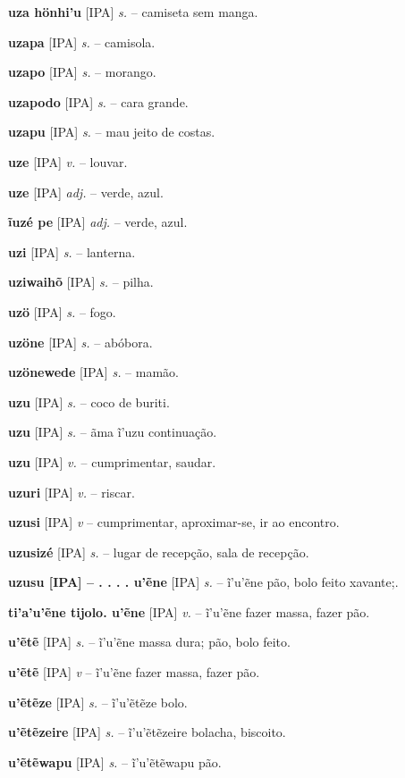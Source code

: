 \textbf{uza hönhi'u} [IPA] \textit{s.} -- camiseta sem manga.

\textbf{uzapa} [IPA] \textit{s.} -- camisola.

\textbf{uzapo} [IPA] \textit{s.} -- morango.

\textbf{uzapodo} [IPA] \textit{s.} -- cara grande.

\textbf{uzapu} [IPA] \textit{s.} -- mau jeito de costas.

\textbf{uze} [IPA] \textit{v.} -- louvar.

\textbf{uze} [IPA] \textit{adj.} -- verde, azul.

\textbf{ĩuzé  pe} [IPA] \textit{adj.} -- verde, azul. \href{https://xavante.pythonanywhere.com/static/dicionario/play.html?file=blue.wav}{\faHeadphones}

\textbf{uzi} [IPA] \textit{s.} -- lanterna.

\textbf{uziwaihõ} [IPA] \textit{s.} -- pilha.

\textbf{uzö} [IPA] \textit{s.} -- fogo.

\textbf{uzöne} [IPA] \textit{s.} -- abóbora.

\textbf{uzönewede} [IPA] \textit{s.} -- mamão.

\textbf{uzu} [IPA] \textit{s.} -- coco de buriti.

\textbf{uzu} [IPA] \textit{s.} -- ãma ĩ'uzu continuação.

\textbf{uzu} [IPA] \textit{v.} -- cumprimentar, saudar.

\textbf{uzuri} [IPA] \textit{v.} -- riscar.

\textbf{uzusi} [IPA] \textit{v} -- cumprimentar, aproximar-se, ir ao encontro.

\textbf{uzusizé} [IPA] \textit{s.} -- lugar de recepção, sala de recepção.

\textbf{uzusu [IPA]  -- . . . . u'ẽne} [IPA] \textit{s.} -- ĩ'u'ẽne pão, bolo feito xavante;.

\textbf{ti'a'u'ẽne tijolo. u'ẽne} [IPA] \textit{v.} -- ĩ'u'ẽne fazer massa, fazer pão.

\textbf{u'ẽtẽ} [IPA] \textit{s.} -- ĩ'u'ẽne massa dura; pão, bolo feito.

\textbf{u'ẽtẽ} [IPA] \textit{v} -- ĩ'u'ẽne fazer massa, fazer pão.

\textbf{u'ẽtẽze} [IPA] \textit{s.} -- ĩ'u'ẽtẽze bolo.

\textbf{u'ẽtẽzeire} [IPA] \textit{s.} -- ĩ'u'ẽtẽzeire bolacha, biscoito.

\textbf{u'ẽtẽwapu} [IPA] \textit{s.} -- ĩ'u'ẽtẽwapu pão.

